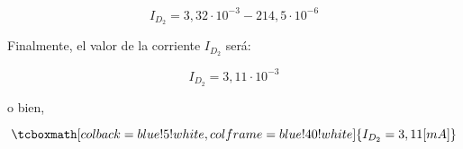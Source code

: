 \documentclass[11pt,fancy,lang=es]{elegantbook}
\begin{document}
\begin{equation}
    I_{D_2} = 3,32 \cdot 10^{-3} - 214,5 \cdot 10^{-6} 
\end{equation}

Finalmente, el valor de la corriente {$I_{D_2}$} será:

\begin{equation}
    I_{D_2} = 3,11 \cdot 10^{-3}
\end{equation}

o bien,

\begin{equation}
\tcboxmath[colback=blue!5!white,colframe=blue!40!white]
{I_{D_2} = 3,11 [mA]}
\end{equation}
\end{document}
